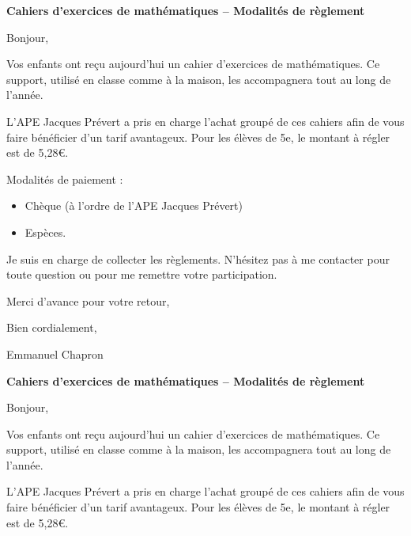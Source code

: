 \documentclass[a4paper]{book}
\begin{document}
\setcounter{chapter}{0}
\newcommand{\montant}{5,28}
\newcommand{\classe}{5e}

    \textbf{Cahiers d’exercices de mathématiques – Modalités de règlement}
    
    Bonjour,

    \medskip
    
    Vos enfants ont reçu aujourd’hui un cahier d’exercices de mathématiques. Ce support, utilisé en classe comme à la maison, les accompagnera tout au long de l’année.

    \medskip

    L’APE Jacques Prévert a pris en charge l’achat groupé de ces cahiers afin de vous faire bénéficier d’un tarif avantageux. Pour les élèves de \classe, le montant à régler est de \montant €.
    
    \medskip

    Modalités de paiement :
    \begin{itemize}
        \item Chèque (à l’ordre de l’APE Jacques Prévert)
        \item Espèces.
    \end{itemize}

    \medskip
    
    Je suis en charge de collecter les règlements. N’hésitez pas à me contacter pour toute question ou pour me remettre votre participation.
    
    Merci d’avance pour votre retour,
    
    Bien cordialement,
    
    Emmanuel Chapron


    \vspace{2cm}
    

    \textbf{Cahiers d’exercices de mathématiques – Modalités de règlement}
    
    Bonjour,

    \medskip
    
    Vos enfants ont reçu aujourd’hui un cahier d’exercices de mathématiques. Ce support, utilisé en classe comme à la maison, les accompagnera tout au long de l’année.

    \medskip

    L’APE Jacques Prévert a pris en charge l’achat groupé de ces cahiers afin de vous faire bénéficier d’un tarif avantageux. Pour les élèves de \classe, le montant à régler est de \montant €.
    
    \medskip
\end{document}
